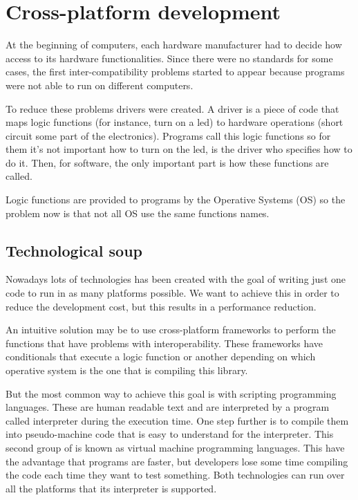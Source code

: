 \chapter{Cross-platform development}

At the beginning of computers, each hardware manufacturer had to decide how
access to its hardware functionalities. Since there were no standards for some
cases, the first inter-compatibility problems started to appear because
programs were not able to run on different computers.

To reduce these problems drivers were created. A driver is a piece of code that 
maps logic functions (for instance, turn on a led) to hardware operations 
(short circuit some part of the electronics). Programs call this logic functions
so for them it's not important how to turn on the led, is the driver who 
specifies how to do it. Then, for software, the only important part is how these
functions are called.

Logic functions are provided to programs by the Operative Systems (OS) so the 
problem now is that not all OS use the same functions names.

\section{Technological soup}

Nowadays lots of technologies has been created with the goal of writing just
one code to run in as many platforms possible. We want to achieve this
in order to reduce the development cost, but this results in a performance
reduction.

An intuitive solution may be to use cross-platform frameworks to perform the 
functions that have problems with interoperability. These frameworks have 
conditionals that execute a logic function or another depending on which 
operative system is the one that is compiling this library.

But the most common way to achieve this goal is with scripting programming
languages. These are human readable text and are interpreted by a program
called interpreter during the execution time. One step further is to compile
them into pseudo-machine code that is easy to understand for the interpreter.
This second group of is known as virtual machine programming languages. This
have the advantage that programs are faster, but developers lose some time
compiling the code each time they want to test something. Both technologies can
run over all the platforms that its interpreter is supported.

